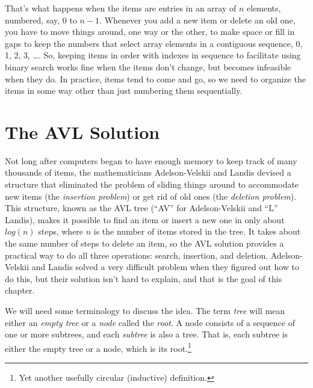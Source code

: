 That's what happens when the items are entries in
an array of $n$ elements,
numbered, say, 0 to $n - 1$.
Whenever you add a new item or delete an old one,
you have to move things around, one way or the other,
to make space or fill in gaps to
keep the numbers that select array elements
in a contiguous sequence, 0, 1, 2, 3, \dots.
So, keeping items in order with indexes in sequence
to facilitate using binary search
works fine when the items don't change,
but becomes infeasible when they do.
In practice, items tend to come and go,
so we need to organize the items in some way
other than just numbering them sequentially.

\section{The AVL Solution}

Not long after computers began to have enough
memory to keep track of many thousands of items,
the mathematicians Adelson-Velskii
and Landis
devised a structure that
eliminated the problem of sliding things around to
accommodate new items (the \emph{insertion problem})
or get rid of old ones (the \emph{deletion problem}).
This structure, known as the
AVL tree
(``AV'' for Adelson-Velskii and ``L'' Landis)\label{AVL-tree},
makes it possible to find an item or
insert a new one
in only about $log(n)$ steps, where $n$ is the number
of items stored in the tree.
It takes about the same number of steps to delete an item,
so the AVL solution provides a practical way to do all three
operations: search, insertion, and deletion.
Adelson-Velskii and Landis solved a very difficult problem
when they figured out how to do this,
but their solution isn't hard to explain,
and that is the goal of this chapter.

We will need some terminology to discuss the idea.
\label{empty-tree-def}The term \emph{tree}
will mean either an \emph{empty tree}
or a \label{node-def}\emph{node} called the
\label{root-def}\emph{root}.
A node consists of a sequence of one or more subtrees, and each
\label{subtree-def}\emph{subtree}
is also a tree.
That is, each subtree is either the empty tree
or a node, which is its root.\footnote{Yet
another usefully circular (inductive) definition.}

